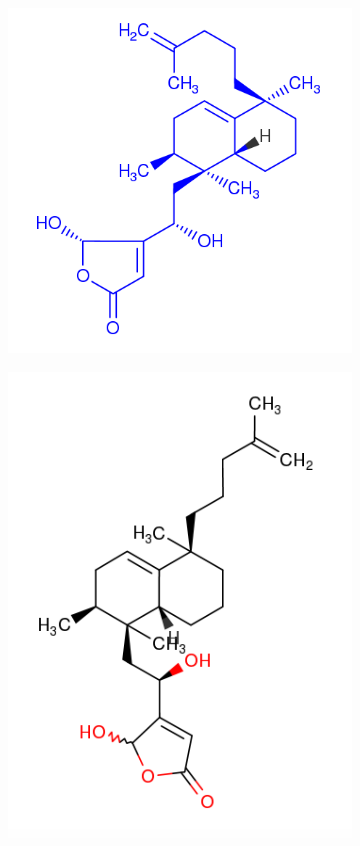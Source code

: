 \documentclass[a4paper,10pt,titlepage]{paper}
\begin{document}
\begin{figure}[H]
\begin{subfigure}{.5\textwidth}
  \centering
  \vspace{0.4cm}
  \includegraphics[width=.8\linewidth]{Billeder/Dysidiolide-7601810-Close.png}
  \vspace{1.3cm}
  \caption{}
\end{subfigure}%
\begin{subfigure}{.5\textwidth}
  \centering
  \includegraphics[width=.8\linewidth]{Billeder/Dysidiolide-7910427-Close.png}

\end{subfigure}
\end{figure}
\end{document}
